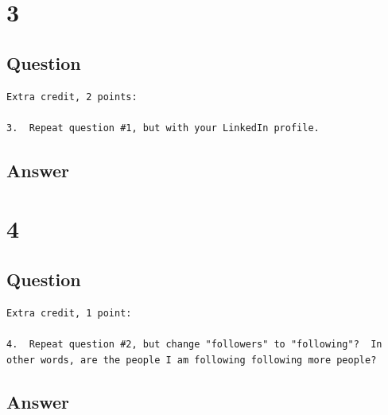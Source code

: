 \documentclass[letterpaper,11pt]{article}
\begin{document}
\newpage




\newpage
\section*{3}

\subsection*{Question}

\begin{verbatim}
Extra credit, 2 points:

3.  Repeat question #1, but with your LinkedIn profile.
\end{verbatim}

\newpage
\subsection*{Answer}

\newpage
\section*{4}

\subsection*{Question}

\begin{verbatim}
Extra credit, 1 point:

4.  Repeat question #2, but change "followers" to "following"?  In
other words, are the people I am following following more people?
\end{verbatim}

\newpage
\subsection*{Answer}


\clearpage


\end{document}
